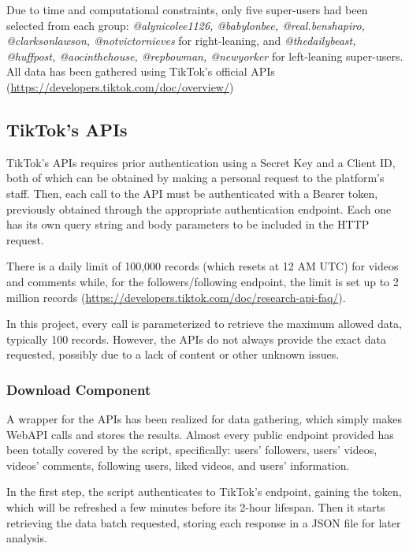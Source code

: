 Due to time and computational constraints, only five super-users had been selected from each group: \textit{@alynicolee1126, @babylonbee, @real.benshapiro, @clarksonlawson, @notvictornieves} for right-leaning, and \textit{@thedailybeast, @huffpost, @aocinthehouse, @repbowman, @newyorker} for left-leaning super-users. \\
All data has been gathered using TikTok's official APIs (\url{https://developers.tiktok.com/doc/overview/})

\subsection{TikTok's APIs}

TikTok's APIs requires prior authentication using a Secret Key and a Client ID, both of which can be obtained by making a personal request to the platform's staff. 
Then, each call to the API must be authenticated with a Bearer token, previously obtained through the appropriate authentication endpoint. Each one has its own query string and body parameters to be included in the HTTP request.

There is a daily limit of 100,000 records (which resets at 12 AM UTC) for videos and comments while, for the followers/following endpoint, the limit is set up to 2 million records (\url{https://developers.tiktok.com/doc/research-api-faq/}).

In this project, every call is parameterized to retrieve the maximum allowed data, typically 100 records. However, the APIs do not always provide the exact data requested, possibly due to a lack of content or other unknown issues.

\subsubsection*{Download Component}

A wrapper for the APIs has been realized for data gathering, which simply makes WebAPI calls and stores the results.
Almost every public endpoint provided has been totally covered by the script, specifically: users' followers, users' videos, videos' comments, following users, liked videos, and users' information.

In the first step, the script authenticates to TikTok's endpoint, gaining the token, which will be refreshed a few minutes before its 2-hour lifespan. Then it starts retrieving the data batch requested, storing each response in a JSON file for later analysis.

